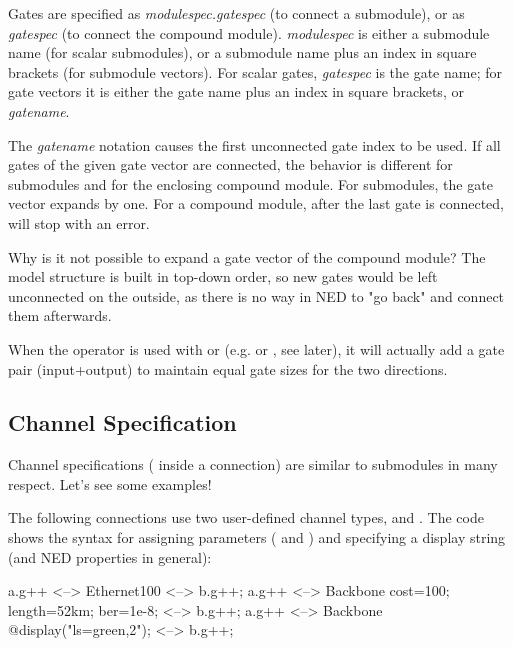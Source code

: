 
Gates are specified as \textit{modulespec.gatespec} (to connect a submodule),
or as \textit{gatespec} (to connect the compound module). \textit{modulespec}
is either a submodule name (for scalar submodules), or a submodule name plus
an index in square brackets (for submodule vectors). For scalar gates,
\textit{gatespec} is the gate name; for gate vectors it is either the gate name
plus an index in square brackets, or \textit{gatename}\ttt{++}.

The \textit{gatename}\ttt{++} notation causes the first unconnected gate index
to be used. If all gates of the given gate vector are connected, the behavior
is different for submodules and for the enclosing compound module.
For submodules, the gate vector expands by one. For a compound module,
after the last gate is connected, \ttt{++} will stop with an error.

\begin{note}
    Why is it not possible to expand a gate vector of the compound
    module? The model structure is built in top-down order, so new gates
    would be left unconnected on the outside, as there is no way in NED to
    "go back" and connect them afterwards.
\end{note}

When the \ttt{++} operator is used with  or 
(e.g.  or , see later), it will actually add
a gate pair (input+output) to maintain equal gate sizes for the two
directions.



\subsection{Channel Specification}
\label{sec:ned-lang:channel-specification}

Channel specifications ( inside a connection)
are similar to submodules in many respect. Let's see some examples!

The following connections use two user-defined channel types,
 and . The code shows the syntax
for assigning parameters ( and ) and specifying
a display string (and NED properties in general):

\begin{ned}
a.g++ <--> Ethernet100 <--> b.g++;
a.g++ <--> Backbone {cost=100; length=52km; ber=1e-8;} <--> b.g++;
a.g++ <--> Backbone {@display("ls=green,2");} <--> b.g++;
\end{ned}

